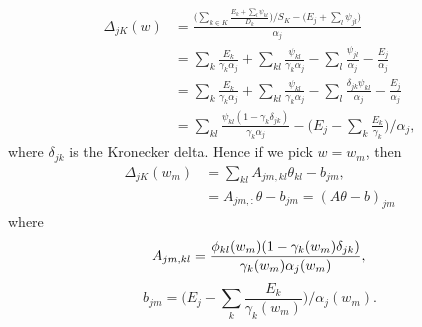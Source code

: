 \documentclass[12pt]{article}
\def\D{\displaystyle}
\begin{document}
\begin{equation}
	\label{eq:delta_split}
	\begin{split}
		\Delta_{jK}(w)&= \frac{\D \Big(\sum_{k\in K} \frac{E_k + \sum_l \psi_{kl}}{D_k} \Big)/ S_K - \Big(E_j + \sum_l \psi_{jl}\Big)}{\alpha_j} \\
		&= \sum_k \frac{E_k}{\gamma_k\alpha_j} + \sum_{kl} \frac{\psi_{kl}}{\gamma_k\alpha_j} - \sum_{l} \frac{\psi_{jl}}{\alpha_j} - \frac{E_j}{\alpha_j}\\
		&= \sum_k \frac{E_k}{\gamma_k\alpha_j} + \sum_{kl} \frac{\psi_{kl}}{\gamma_k\alpha_j} - \sum_{l} \frac{\delta_{jk}\psi_{kl}}{\alpha_j} - \frac{E_j}{\alpha_j}\\
		&= \sum_{kl} \frac{\psi_{kl} (1-\gamma_k\delta_{jk})}{\gamma_k\alpha_j} - \Big(E_j - \sum_k\frac{E_k}{\gamma_k}\Big)/\alpha_j,
	\end{split}
\end{equation}
where $\delta_{jk}$ is the Kronecker delta. Hence if we pick $w = w_m$, then
\begin{equation}
	\begin{split}
		\Delta_{jK}(w_m) &= \sum_{kl} A_{jm, kl} \theta_{kl} - b_{jm}, \\
		&= A_{jm,:}\theta - b_{jm} = (A\theta - b)_{jm}
	\end{split}	
\end{equation}
where
\begin{equation}
	A_{jm, kl} = \frac{\phi_{kl}(w_m)(1 - \gamma_k(w_m) \delta_{jk})}{\gamma_k(w_m) \alpha_j(w_m)},\\
\end{equation}
\begin{equation}
	b_{jm} = \Big(E_j - \sum_k\frac{E_k}{\gamma_k(w_m)}\Big)/\alpha_j(w_m).
\end{equation}



\iffalse
&= \frac{\D \left(\sum_{k\in K} \frac{E_k + \sum_l \theta_{kl} \phi_{kl}(w)}{D_k(w)} / S_K(w)\right) - \left(E_j + \sum_l \theta_{jl} \phi_{jl}(w)\right)}{D_j(w)S_K(w)-1}, \\
\fi
\end{document}
